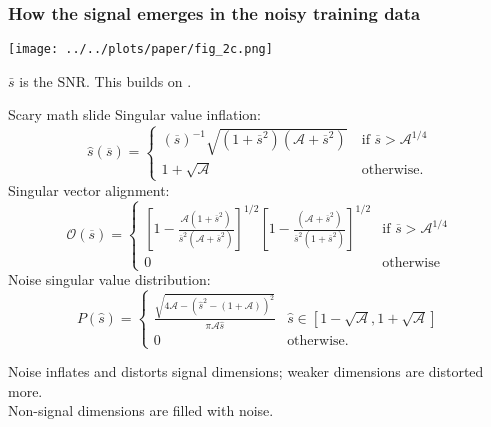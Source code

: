 \documentclass{beamer}
\begin{document}
\begin{frame}[label=signal_from_noise]
\frametitle{How the signal emerges in the noisy training data}
\vspace{-0.5em}
\begin{center}%
\texttt{[image: ../../plots/paper/fig\_2c.png]}%
\\
\end{center}
\vspace{-1em}
{\footnotesize $\bar{s}$ is the $\text{SNR}$. This builds on \citet{Benaych-Georges2012}.}

\end{frame}


\begin{frame}{Scary math slide}
Singular value inflation:
$$
\hat{s}(\overline{s}) = \begin{cases}
{(\overline{s})^{-1}}{\sqrt{(1+\overline{s}^2)(\mathcal{A}+\overline{s}^2)}}\ & \text{if } \overline{s} > \mathcal{A}^{1/4} \\
1+\sqrt{\mathcal{A}} & \text{otherwise}.
\end{cases}
$$
Singular vector alignment:
$$\mathcal{O}(\overline{s}) = 
\begin{cases}
\left[1-
        \frac{\mathcal{A}(1+\overline{s}^2)}          
            {\overline{s}^2(\mathcal{A}+\overline{s}^2)}
\right]^{1/2} 
\left[1-
        \frac{(\mathcal{A}+\overline{s}^2)}          
            {\overline{s}^2(1+\overline{s}^2)}
\right]^{1/2}

& \text{if } \overline{s} > \mathcal{A}^{1/4} \\
0 & \text{otherwise}
\end{cases}
$$
Noise singular value distribution:
$$P(\hat{s}) = \begin{cases}
\frac{\sqrt{4\mathcal{A}-(\hat{s}^2 - (1+\mathcal{A}))^2}}{\pi \mathcal{A}\hat{s}} & \hat{s} \in [1-\sqrt{\mathcal{A}}, 1+\sqrt{\mathcal{A}}] \\
0 & \text{otherwise}.
\end{cases}
$$
\end{frame}

\begin{frame}[standout]
Noise inflates and distorts signal dimensions; weaker dimensions are distorted more. \\[1em]
Non-signal dimensions are filled with noise.
\end{frame}
\end{document}
